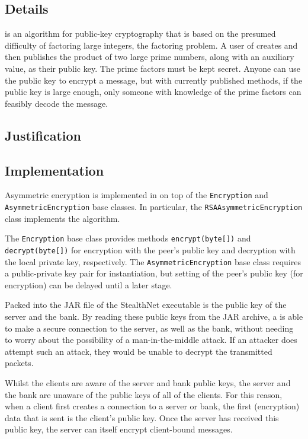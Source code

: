\documentclass[a4paper,11pt]{article}
\begin{document}
\subsection{Details}
 is an algorithm for public-key cryptography that is based on the
presumed difficulty of factoring large integers, the factoring problem. A user 
of  creates and then publishes the product of two large prime 
numbers, along with an auxiliary value, as their public key. The prime factors 
must be kept secret. Anyone can use the public key to encrypt a message, but 
with currently published methods, if the public key is large enough, only 
someone with knowledge of the prime factors can feasibly decode the message. 


\subsection{Justification}

\subsection{Implementation}
Asymmetric encryption is implemented in \packageName{} on top of the 
\verb+Encryption+ and \verb+AsymmetricEncryption+ base classes. In particular, 
the \verb+RSAAsymmetricEncryption+ class implements the  
algorithm.

The \verb+Encryption+ base class provides methods \verb+encrypt(byte[])+ and 
\verb+decrypt(byte[])+ for encryption with the peer's public key and decryption 
with the local private key, respectively.  The \verb+AsymmetricEncryption+ base 
class requires a public-private key pair for instantiation, but setting of the 
peer's public key (for encryption) can be delayed until a later stage.

Packed into the JAR file of the StealthNet executable is the public key of the 
\serviceName{} server and the \serviceName{} bank. By reading these public keys 
from the JAR archive, a \serviceName{} is able to make a secure connection to 
the \serviceName{} server, as well as the \serviceName{} bank, without needing 
to worry about the possibility of a man-in-the-middle attack. If an attacker 
does attempt such an attack, they would be unable to decrypt the transmitted 
packets.

Whilst the clients are aware of the server and bank public keys, the server and 
the bank are unaware of the public keys of all of the clients. For this reason, 
when a client first creates a connection to a \serviceName{} server or bank, the
first (encryption) data that is sent is the client's public key. Once the server
has received this public key, the server can itself encrypt client-bound 
messages.
\end{document}
